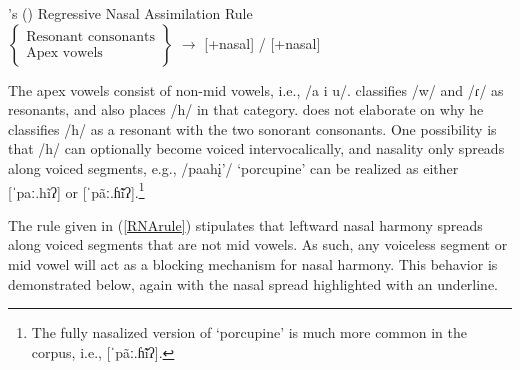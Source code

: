 \begin{exe}
\item\label{RNArule} \citeauthor{hollow1970}'s (\citeyear[21]{hollow1970}) Regressive Nasal Assimilation Rule\\

$\begin{Bmatrix}
\textrm{Resonant consonants}\\
\textrm{Apex vowels}
\end{Bmatrix}$ $\to$ [+nasal] / {\longrule}[+nasal]
\\
\end{exe}

The apex vowels consist of non-mid vowels, i.e., /a i u/. \citet{hollow1970} classifies /w/ and /ɾ/ as resonants, and also places /h/ in that category. \citet{hollow1970} does not elaborate on why he classifies /h/ as a resonant with the two sonorant consonants. One possibility is that /h/ can optionally become voiced intervocalically, and nasality only spreads along voiced segments, e.g., /paahį'/ `porcupine' can be realized as either [ˈpaː.hĩʔ] or [ˈpãː.ɦ̃ĩʔ].\footnote{The fully nasalized version of `porcupine' is much more common in the corpus, i.e., [ˈpãː.ɦ̃ĩʔ].}

The rule given in (\ref{RNArule}) stipulates that leftward nasal harmony spreads along voiced segments that are not mid vowels. As such, any voiceless segment or mid vowel will act as a blocking mechanism for nasal harmony. This behavior is demonstrated below, again with the nasal spread highlighted with an underline.


